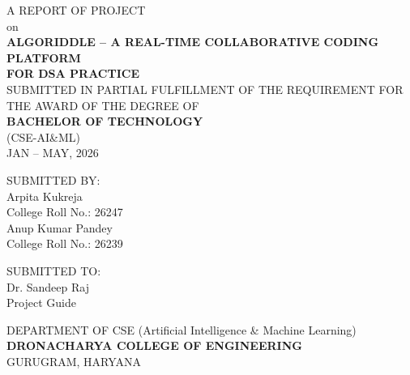 \documentclass[12pt,a4paper,oneside]{report}
\begin{document}

\begin{titlepage}
\begin{center}

\vspace*{1cm}

{\fontsize{14}{17}\selectfont A REPORT OF PROJECT}\\[0.5cm]
{\fontsize{14}{17}\selectfont on}\\[0.5cm]
{\fontsize{14}{17}\bfseries\selectfont ALGORIDDLE -- A REAL-TIME COLLABORATIVE CODING PLATFORM\\FOR DSA PRACTICE}\\[1.5cm]

{\fontsize{12}{14}\selectfont SUBMITTED IN PARTIAL FULFILLMENT OF THE REQUIREMENT FOR THE AWARD OF THE DEGREE OF}\\[0.5cm]

{\fontsize{14}{17}\bfseries\selectfont BACHELOR OF TECHNOLOGY}\\[0.3cm]
{\fontsize{14}{17}\selectfont (CSE-AI\&ML)}\\[1.5cm]

{\fontsize{14}{17}\selectfont JAN -- MAY, 2026}\\[2cm]

\begin{minipage}[t]{0.45\textwidth}
\raggedright
{\fontsize{12}{14}\selectfont SUBMITTED BY:}\\[0.3cm]
{\fontsize{12}{14}\selectfont Arpita Kukreja}\\
{\fontsize{12}{14}\selectfont College Roll No.: 26247}\\[0.3cm]
{\fontsize{12}{14}\selectfont Anup Kumar Pandey}\\
{\fontsize{12}{14}\selectfont College Roll No.: 26239}\\
\end{minipage}
\hfill
\begin{minipage}[t]{0.45\textwidth}
\raggedleft
{\fontsize{12}{14}\selectfont SUBMITTED TO:}\\[0.3cm]
{\fontsize{12}{14}\selectfont Dr. Sandeep Raj}\\
{\fontsize{12}{14}\selectfont Project Guide}\\
\end{minipage}

\vfill

{\fontsize{12}{14}\selectfont DEPARTMENT OF CSE (Artificial Intelligence \& Machine Learning)}\\[0.3cm]
{\fontsize{14}{17}\bfseries\selectfont DRONACHARYA COLLEGE OF ENGINEERING}\\[0.2cm]
{\fontsize{14}{17}\selectfont GURUGRAM, HARYANA}

\end{center}
\end{titlepage}
\end{document}
